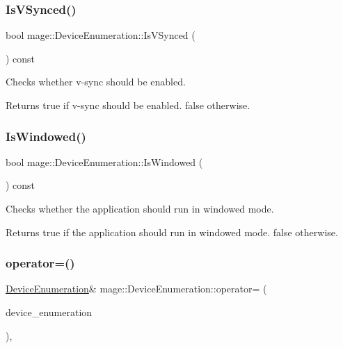 \subsubsection{\texorpdfstring{Is\+V\+Synced()}{IsVSynced()}}
{\footnotesize\ttfamily bool mage\+::\+Device\+Enumeration\+::\+Is\+V\+Synced (\begin{DoxyParamCaption}{ }\end{DoxyParamCaption}) const}

Checks whether v-\/sync should be enabled.

\begin{DoxyReturn}{Returns}
{\ttfamily true} if v-\/sync should be enabled. {\ttfamily false} otherwise. 
\end{DoxyReturn}
\hypertarget{classmage_1_1_device_enumeration_a51479c8c85b286f78730c5622604e524}{}\label{classmage_1_1_device_enumeration_a51479c8c85b286f78730c5622604e524} 
\subsubsection{\texorpdfstring{Is\+Windowed()}{IsWindowed()}}
{\footnotesize\ttfamily bool mage\+::\+Device\+Enumeration\+::\+Is\+Windowed (\begin{DoxyParamCaption}{ }\end{DoxyParamCaption}) const}

Checks whether the application should run in windowed mode.

\begin{DoxyReturn}{Returns}
{\ttfamily true} if the application should run in windowed mode. {\ttfamily false} otherwise. 
\end{DoxyReturn}
\hypertarget{classmage_1_1_device_enumeration_a03e3affa2b8bb4837cffda7b11389bea}{}\label{classmage_1_1_device_enumeration_a03e3affa2b8bb4837cffda7b11389bea} 
\subsubsection{\texorpdfstring{operator=()}{operator=()}\hspace{0.1cm}{\footnotesize\ttfamily [1/2]}}
{\footnotesize\ttfamily \hyperlink{classmage_1_1_device_enumeration}{Device\+Enumeration}\& mage\+::\+Device\+Enumeration\+::operator= (\begin{DoxyParamCaption}\item[{const \hyperlink{classmage_1_1_device_enumeration}{Device\+Enumeration} \&}]{device\+\_\+enumeration }\end{DoxyParamCaption})\hspace{0.3cm}{\ttfamily [private]}, {\ttfamily [delete]}}

